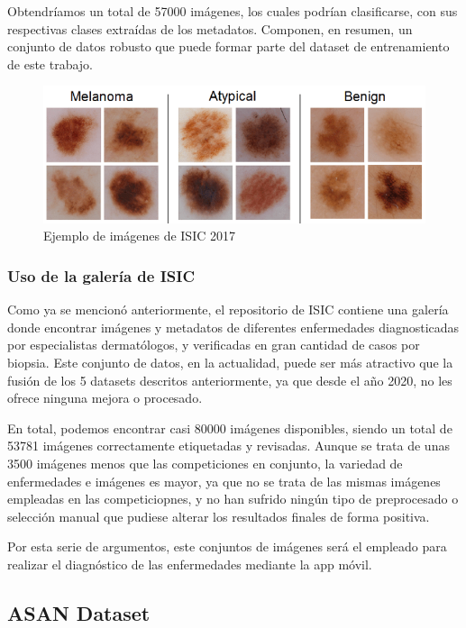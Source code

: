 Obtendríamos un total de 57000 imágenes, los cuales podrían clasificarse, con sus respectivas clases extraídas de los metadatos. Componen, en resumen, un conjunto de datos robusto que puede formar parte del dataset de entrenamiento de este trabajo.
\begin{figure}[H]
	\centering
	\includegraphics[scale = 0.5]{imagenes/Ejemplo2020.png}
	\caption{Ejemplo de imágenes de ISIC 2017}
	\label{fig:enter-label}
\end{figure}

\subsubsection{Uso de la galería de ISIC}

Como ya se mencionó anteriormente, el repositorio de ISIC contiene una galería donde encontrar imágenes y metadatos de diferentes enfermedades diagnosticadas por especialistas dermatólogos, y verificadas en gran cantidad de casos por biopsia. Este conjunto de datos, en la actualidad, puede ser más atractivo que la fusión de los  5 datasets descritos anteriormente, ya que desde el año 2020, no les ofrece ninguna mejora o procesado.

En total, podemos encontrar casi 80000 imágenes disponibles, siendo un total de 53781 imágenes correctamente etiquetadas y revisadas. Aunque se trata de unas 3500 imágenes menos que las competiciones en conjunto, la variedad de enfermedades e imágenes es mayor, ya que no se trata de las mismas imágenes empleadas en las competiciopnes, y no han sufrido ningún tipo de preprocesado o selección manual que pudiese alterar los resultados finales de forma positiva.

Por esta serie de argumentos, este conjuntos de imágenes será el empleado para realizar el diagnóstico de las enfermedades mediante la app móvil.

\subsection{ASAN Dataset}

